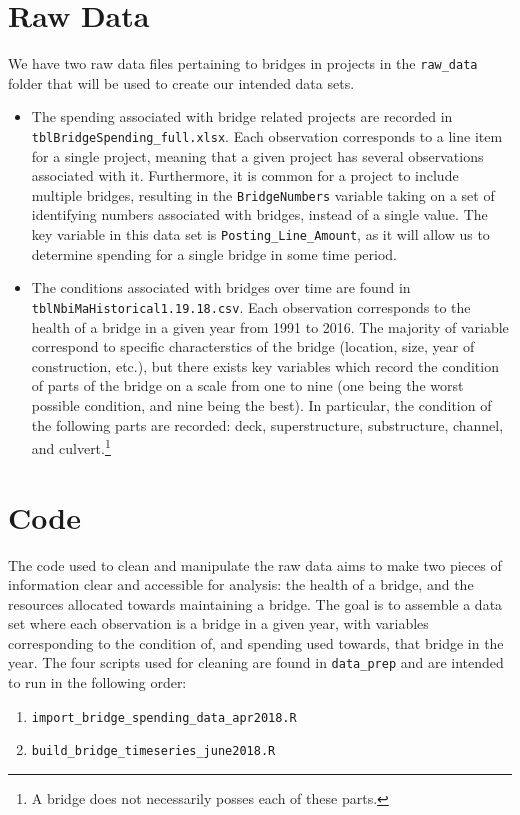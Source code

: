 \documentclass{article}
\begin{document}
\section{Raw Data}
We have two raw data files pertaining to bridges in projects in the \texttt{raw\_data} folder that will be used to create our intended data sets.
\begin{itemize}
	\item The spending associated with bridge related projects are recorded in \texttt{tblBridgeSpending\_full.xlsx}. Each observation corresponds to a line item for a single project, meaning that a given project has several observations associated with it. Furthermore, it is common for a project to include multiple bridges, resulting in the \texttt{BridgeNumbers} variable taking on a set of identifying numbers associated with bridges, instead of a single value. The key variable in this data set is \texttt{Posting\_Line\_Amount}, as it will allow us to determine spending for a single bridge in some time period. 
	\item The conditions associated with bridges over time are found in \texttt{tblNbiMaHistorical1.19.18.csv}. Each observation corresponds to the health of a bridge in a given year from 1991 to 2016. The majority of variable correspond to specific characterstics of the bridge (location, size, year of construction, etc.), but there exists key variables which record the condition of parts of the bridge on a scale from one to nine (one being the worst possible condition, and nine being the best). In particular, the condition of the following parts are recorded: deck, superstructure, substructure, channel, and culvert.\footnote{A bridge does not necessarily posses each of these parts.}  

\end{itemize} 
\section{Code}
The code used to clean and manipulate the raw data aims to make two pieces of information clear and accessible for analysis: the health of a bridge, and the resources allocated towards maintaining a bridge. The goal is to assemble a data set where each observation is a bridge in a given year, with variables corresponding to the condition of, and spending used towards, that bridge in the year.  The four scripts used for cleaning are found in \texttt{data\_prep} and are intended to run in the following order:
\begin{enumerate}
	\item \texttt{import\_bridge\_spending\_data\_apr2018.R}
	\item  \texttt{build\_bridge\_timeseries\_june2018.R} 
\end{enumerate}  
\end{document}
